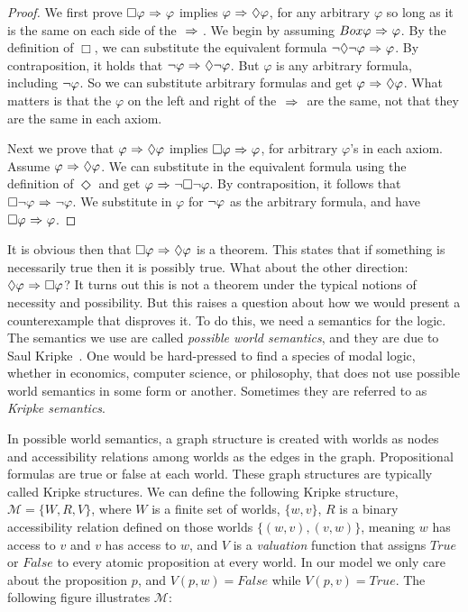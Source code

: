 \begin{proof}
	We first prove $\Box \varphi {\ \Rightarrow \ } \varphi$ implies $\varphi {\ \Rightarrow \ } \Diamond \varphi$, for any arbitrary $\varphi$ so long as it is the same on each side of the ${\ \Rightarrow \ }$. We begin by assuming $Box \varphi {\ \Rightarrow \ } \varphi$. By the definition of $\Box$, we can substitute the equivalent formula ${\neg} \Diamond {\neg} \varphi {\ \Rightarrow \ } \varphi$. By contraposition, it holds that ${\neg} \varphi {\ \Rightarrow \ } \Diamond {\neg} \varphi$. But $\varphi$ is any arbitrary formula, including ${\neg} \varphi$. So we can substitute arbitrary formulas and get $\varphi {\ \Rightarrow \ } \Diamond \varphi$. What matters is that the $\varphi$ on the left and right of the ${\ \Rightarrow \ }$ are the same, not that they are the same in each axiom.
	
	Next we prove that $\varphi {\ \Rightarrow \ } \Diamond \varphi$ implies $\Box \varphi {\ \Rightarrow \ } \varphi$, for arbitrary $\varphi$'s in each axiom. Assume $\varphi {\ \Rightarrow \ } \Diamond \varphi$. We can substitute in the equivalent formula using the definition of $\Diamond$ and get $\varphi {\ \Rightarrow \ } {\neg} \Box {\neg} \varphi$. By contraposition, it follows that $\Box {\neg} \varphi {\ \Rightarrow \ } {\neg} \varphi$. We substitute in $\varphi$ for ${\neg} \varphi$ as the arbitrary formula, and have $\Box \varphi {\ \Rightarrow \ } \varphi$.
\end{proof}

It is obvious then that $\Box \varphi {\ \Rightarrow \ } \Diamond \varphi$ is a theorem. This states that if something is necessarily true then it is possibly true. What about the other direction: $\Diamond \varphi {\ \Rightarrow \ } \Box \varphi$? It turns out this is not a theorem under the typical notions of necessity and possibility. But this raises a question about how we would present a counterexample that disproves it. To do this, we need a semantics for the logic. The semantics we use are called \emph{possible world semantics}, and they are due to Saul Kripke~\cite{Kripke}. One would be hard-pressed to find a species of modal logic, whether in economics, computer science, or philosophy, that does not use possible world semantics in some form or another. Sometimes they are referred to as \emph{Kripke semantics}.

In possible world semantics, a graph structure is created with worlds as nodes and accessibility relations among worlds as the edges in the graph. Propositional formulas are true or false at each world. These graph structures are typically called Kripke structures. We can define the following Kripke structure, $\mathcal{M} = \{W, R, V\}$, where $W$ is a finite set of worlds, $\{w, v\}$, $R$ is a binary accessibility relation defined on those worlds $\{(w,v), (v,w)\}$, meaning $w$ has access to $v$ and $v$ has access to $w$, and $V$ is a \emph{valuation} function that assigns $True$ or $False$ to every atomic proposition at every world. In our model we only care about the proposition $p$, and $V(p, w)=False$ while $V(p,v)=True$. The following figure illustrates $\mathcal{M}$:

